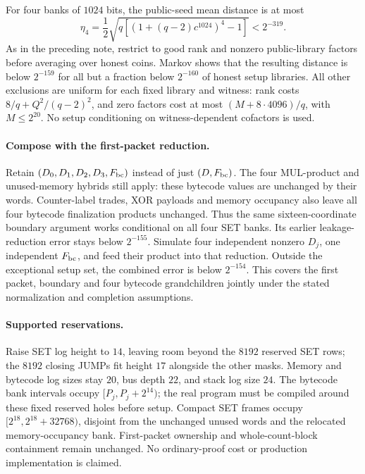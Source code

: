 For four banks of $1024$ bits, the public-seed mean distance is at most
\[
 \eta_4=\frac12\sqrt{q\left[(1+(q-2)c^{1024})^4-1\right]}<2^{-319}.
\]
As in the preceding note, restrict to good rank and nonzero public-library factors before averaging over honest coins. Markov shows that the resulting distance is below $2^{-159}$ for all but a fraction below $2^{-160}$ of honest setup libraries. All other exclusions are uniform for each fixed library and witness: rank costs $8/q+Q^2/(q-2)^2$, and zero factors cost at most $(M+8\cdot4096)/q$, with $M\le2^{20}$. No setup conditioning on witness-dependent cofactors is used.

\paragraph{Compose with the first-packet reduction.} Retain $(D_0,D_1,D_2,D_3,F_{\rm bc})$ instead of just $(D,F_{\rm bc})$. The four MUL-product and unused-memory hybrids still apply: these bytecode values are unchanged by their words. Counter-label trades, XOR payloads and memory occupancy also leave all four bytecode finalization products unchanged. Thus the same sixteen-coordinate boundary argument works conditional on all four SET banks. Its earlier leakage-reduction error stays below $2^{-155}$. Simulate four independent nonzero $D_j$, one independent $F_{\rm bc}$, and feed their product into that reduction. Outside the exceptional setup set, the combined error is below $2^{-154}$. This covers the first packet, boundary and four bytecode grandchildren jointly under the stated normalization and completion assumptions.

\paragraph{Supported reservations.} Raise SET log height to $14$, leaving room beyond the $8192$ reserved SET rows; the $8192$ closing JUMPs fit height $17$ alongside the other masks. Memory and bytecode log sizes stay $20$, bus depth $22$, and stack log size $24$. The bytecode bank intervals occupy $[P_j,P_j+2^{14})$; the real program must be compiled around these fixed reserved holes before setup. Compact SET frames occupy $[2^{18},2^{18}+32768)$, disjoint from the unchanged unused words and the relocated memory-occupancy bank. First-packet ownership and whole-count-block containment remain unchanged. No ordinary-proof cost or production implementation is claimed.

